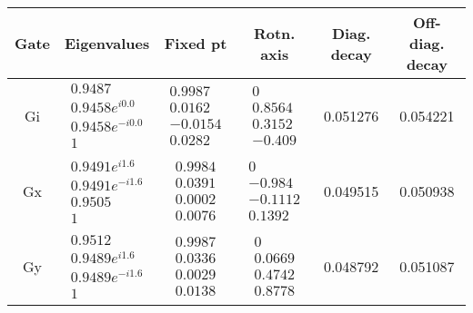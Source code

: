 {\begin{table}[h]
\begin{center}
\begin{tabular}[l]{|c|c|c|c|c|c|}
\hline
Gate & Eigenvalues & Fixed pt & Rotn. axis & Diag. decay & Off-diag. decay \\ \hline
Gi & $ \begin{array}{c}
0.9487 \\ 
0.9458e^{i0.0} \\ 
0.9458e^{-i0.0} \\ 
1
 \end{array} $
 & $ \begin{array}{c}
0.9987 \\ 
0.0162 \\ 
-0.0154 \\ 
0.0282
 \end{array} $
 & $ \begin{array}{c}
0 \\ 
0.8564 \\ 
0.3152 \\ 
-0.409
 \end{array} $
 & 0.051276 & 0.054221 \\ \hline
Gx & $ \begin{array}{c}
0.9491e^{i1.6} \\ 
0.9491e^{-i1.6} \\ 
0.9505 \\ 
1
 \end{array} $
 & $ \begin{array}{c}
0.9984 \\ 
0.0391 \\ 
0.0002 \\ 
0.0076
 \end{array} $
 & $ \begin{array}{c}
0 \\ 
-0.984 \\ 
-0.1112 \\ 
0.1392
 \end{array} $
 & 0.049515 & 0.050938 \\ \hline
Gy & $ \begin{array}{c}
0.9512 \\ 
0.9489e^{i1.6} \\ 
0.9489e^{-i1.6} \\ 
1
 \end{array} $
 & $ \begin{array}{c}
0.9987 \\ 
0.0336 \\ 
0.0029 \\ 
0.0138
 \end{array} $
 & $ \begin{array}{c}
0 \\ 
0.0669 \\ 
0.4742 \\ 
0.8778
 \end{array} $
 & 0.048792 & 0.051087 \\ \hline
\end{tabular}


\end{center}
\end{table}}

